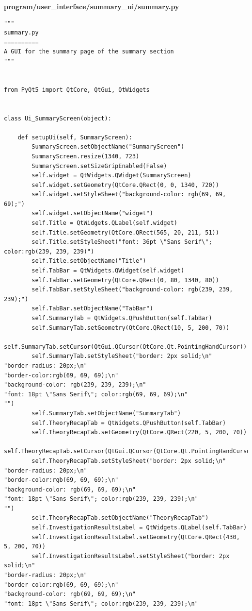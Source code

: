 \documentclass{article}
\begin{document}
\textbf{program/user\_interface/summary\_ui/summary.py}
\begin{lstlisting}
"""
summary.py
==========
A GUI for the summary page of the summary section
"""


from PyQt5 import QtCore, QtGui, QtWidgets


class Ui_SummaryScreen(object):

    def setupUi(self, SummaryScreen):
        SummaryScreen.setObjectName("SummaryScreen")
        SummaryScreen.resize(1340, 723)
        SummaryScreen.setSizeGripEnabled(False)
        self.widget = QtWidgets.QWidget(SummaryScreen)
        self.widget.setGeometry(QtCore.QRect(0, 0, 1340, 720))
        self.widget.setStyleSheet("background-color: rgb(69, 69, 69);")
        self.widget.setObjectName("widget")
        self.Title = QtWidgets.QLabel(self.widget)
        self.Title.setGeometry(QtCore.QRect(565, 20, 211, 51))
        self.Title.setStyleSheet("font: 36pt \"Sans Serif\"; color:rgb(239, 239, 239)")
        self.Title.setObjectName("Title")
        self.TabBar = QtWidgets.QWidget(self.widget)
        self.TabBar.setGeometry(QtCore.QRect(0, 80, 1340, 80))
        self.TabBar.setStyleSheet("background-color: rgb(239, 239, 239);")
        self.TabBar.setObjectName("TabBar")
        self.SummaryTab = QtWidgets.QPushButton(self.TabBar)
        self.SummaryTab.setGeometry(QtCore.QRect(10, 5, 200, 70))
        self.SummaryTab.setCursor(QtGui.QCursor(QtCore.Qt.PointingHandCursor))
        self.SummaryTab.setStyleSheet("border: 2px solid;\n"
"border-radius: 20px;\n"
"border-color:rgb(69, 69, 69);\n"
"background-color: rgb(239, 239, 239);\n"
"font: 18pt \"Sans Serif\"; color:rgb(69, 69, 69);\n"
"")
        self.SummaryTab.setObjectName("SummaryTab")
        self.TheoryRecapTab = QtWidgets.QPushButton(self.TabBar)
        self.TheoryRecapTab.setGeometry(QtCore.QRect(220, 5, 200, 70))
        self.TheoryRecapTab.setCursor(QtGui.QCursor(QtCore.Qt.PointingHandCursor))
        self.TheoryRecapTab.setStyleSheet("border: 2px solid;\n"
"border-radius: 20px;\n"
"border-color:rgb(69, 69, 69);\n"
"background-color: rgb(69, 69, 69);\n"
"font: 18pt \"Sans Serif\"; color:rgb(239, 239, 239);\n"
"")
        self.TheoryRecapTab.setObjectName("TheoryRecapTab")
        self.InvestigationResultsLabel = QtWidgets.QLabel(self.TabBar)
        self.InvestigationResultsLabel.setGeometry(QtCore.QRect(430, 5, 200, 70))
        self.InvestigationResultsLabel.setStyleSheet("border: 2px solid;\n"
"border-radius: 20px;\n"
"border-color:rgb(69, 69, 69);\n"
"background-color: rgb(69, 69, 69);\n"
"font: 18pt \"Sans Serif\"; color:rgb(239, 239, 239);\n"

\end{lstlisting}
\end{document}
